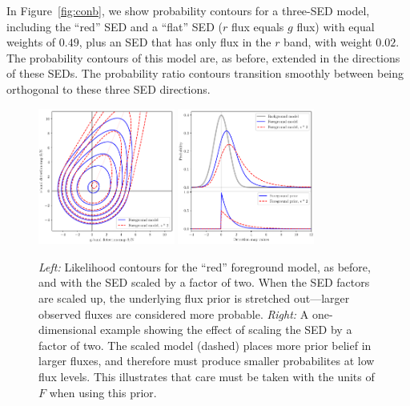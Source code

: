 \documentclass[letterpaper,preprint]{aastex62}
\newcommand{\figref}[1]{\mbox{Figure~\ref{#1}}}
\begin{document}
In \figref{fig:conb}, we show probability contours for a three-SED
model, including the ``red'' SED and a ``flat'' SED ($r$ flux equals
$g$ flux) with equal weights of $0.49$, plus an SED that has only flux
in the $r$ band, with weight $0.02$.  The probability contours of this
model are, as before, extended in the directions of these SEDs.  The
probability ratio contours transition smoothly between being
orthogonal to these three SED directions.


\begin{figure}
    \begin{center}
    \includegraphics[width=0.4\textwidth]{prob-contours-c}
    \includegraphics[width=0.4\textwidth]{prob-1d}
    \caption{ \emph{Left:} Likelihood contours for the ``red''
      foreground model, as before, and with the SED scaled by a factor
      of two.  When the SED factors are scaled up, the underlying flux
      prior is stretched out---larger observed fluxes are considered
      more probable.  \emph{Right:} A one-dimensional example showing
      the effect of scaling the SED by a factor of two.  The scaled
      model (dashed) places more prior belief in larger fluxes, and
      therefore must produce smaller probabilites at low flux levels.
      This illustrates that care must be taken with the units of $F$
      when using this prior.
      \label{fig:scaling}
    }
    \end{center}
\end{figure}
\end{document}
